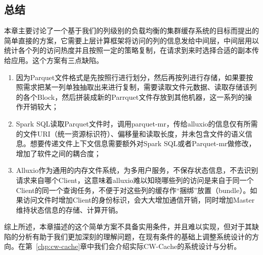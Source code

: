 \subsection{总结}

\par 本章主要讨论了一个基于我们的列级别的负载均衡的集群缓存系统的目标而提出的简单直接的方案，它需要上层计算框架将访问的列的信息发给中间层，中间层用以统计各个列的访问热度并且按照一定的策略复制，在请求到来时选择合适的副本传给应用。这个方案有三点缺陷。

\begin{enumerate}
    \item 因为Parquet文件格式是先按照行进行划分，然后再按列进行存储，如果要按照需求把某一列单独抽取出来进行复制，需要读取文件元数据、读取存储该列的各个Block，然后拼装成新的Parrquet文件存放到其他机器，这一系列的操作开销较大；
    \item Spark SQL读取Parquet文件时，调用parquet-mr，传给alluxio的信息仅有所需的文件URI（统一资源标识符）、偏移量和读取长度，并未包含文件的语义信息。想要传递文件上下文信息需要额外对Spark SQL或者Parquet-mr做修改，增加了软件之间的耦合度；
    \item Alluxio作为通用的内存文件系统，为多用户服务，不保存状态信息，不去识别请求来自哪个Client，这意味着alluxio难以知晓哪些列的访问是来自于同一个Client的同一个查询任务，不便于对这些列的缓存作“捆绑”放置（bundle）。如果访问文件时增加Client的身份标识，会大大增加通信开销，同时增加Master维持状态信息的存储、计算开销。
\end{enumerate}

\par 综上所述，本章描述的这个简单方案不具备实用条件，并且难以实现，但对于其缺陷的分析有助于我们更加深刻的理解问题，在现有条件的基础上调整系统设计的方向。在第~\ref{chp:cw-cache}章中我们会介绍实际CW-Cache的系统设计与分析。